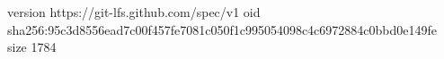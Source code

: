 version https://git-lfs.github.com/spec/v1
oid sha256:95c3d8556ead7c00f457fe7081c050f1c995054098c4c6972884c0bbd0e149fe
size 1784
